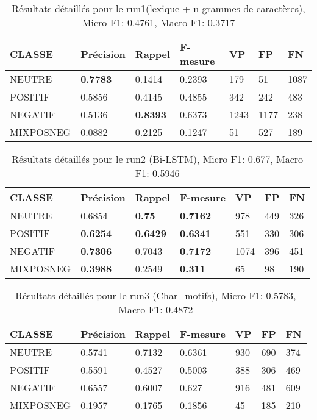 \begin{table}
\begin{tabular}{l|l|l|l|l|l|l}
  CLASSE	&Précision	&Rappel	&F-mesure	&VP	&FP	&FN\\
\hline
\hline
  NEUTRE	&\textbf{0.7783}	&0.1414	&0.2393	&179	&51	&1087\\
  POSITIF	&0.5856	&0.4145	&0.4855	&342	&242	&483\\
  NEGATIF	&0.5136	&\textbf{0.8393}	&0.6373	&1243	&1177	&238\\
  MIXPOSNEG	&0.0882	&0.2125	&0.1247	&51	&527	&189\\
\hline
\end{tabular}
\caption{Résultats détaillés pour le run1(lexique + n-grammes de caractères),
  Micro F1: 0.4761, Macro F1: 0.3717}
\end{table}

\begin{table}
\begin{tabular}{l|l|l|l|l|l|l}
  CLASSE	&Précision	&Rappel	&F-mesure	&VP	&FP	&FN\\
\hline
\hline
  NEUTRE	&0.6854	&\textbf{0.75}	&\textbf{0.7162}	&978	&449	&326\\
  POSITIF	&\textbf{0.6254}	&\textbf{0.6429}	&\textbf{0.6341}	&551	&330	&306\\
  NEGATIF	&\textbf{0.7306}	&0.7043	&\textbf{0.7172}	&1074	&396	&451\\
  MIXPOSNEG	&\textbf{0.3988}	&0.2549	&\textbf{0.311}	&65	&98	&190\\
\hline
\end{tabular}
\caption{Résultats détaillés pour le run2 (Bi-LSTM),
  Micro F1: 0.677, Macro F1: 0.5946}
\end{table}

\begin{table}
\begin{tabular}{l|l|l|l|l|l|l}
  CLASSE	&Précision	&Rappel	&F-mesure	&VP	&FP	&FN\\
\hline
\hline
  NEUTRE	&0.5741	&0.7132	&0.6361	&930	&690	&374\\
  POSITIF	&0.5591	&0.4527	&0.5003	&388	&306	&469\\
  NEGATIF	&0.6557	&0.6007	&0.627	&916	&481	&609\\
  MIXPOSNEG	&0.1957	&0.1765	&0.1856	&45	&185	&210\\
\hline
\end{tabular}
\caption{Résultats détaillés pour le run3 (Char\_motifs),
  Micro F1: 0.5783, Macro F1: 0.4872}
\end{table}

